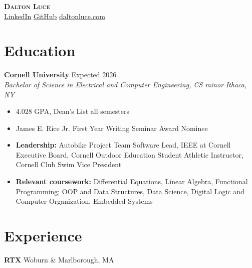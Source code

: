 \documentclass[letterpaper,10pt]{article}
\newcommand{\company}[2]{
    \vspace{6pt}
    {\large \textbf{#1}}
    \hfill
    {\normalsize {#2}}
    \\
}
\newcommand{\resumeEntry}[4]{
    \vspace{4pt}
    {\large \textbf{#1}}
    \hfill
    {\normalsize #2}
    \\
    \textit{#3} \hfill \textit{#4}
    \vspace{1pt}
}
\newcommand{\itemsBegin}{
    \begin{itemize}[leftmargin=0.2in, labelsep=0.05in, itemsep=0pt, parsep=1pt, topsep=0pt, partopsep=0pt]
}
\newcommand{\itemsEnd}{\end{itemize}}
\begin{document}
\textbf{\huge \scshape Dalton Luce} \\
\vspace{2pt}
\small
\addressConditional{}   %
\phoneConditional{}     %
\emailConditional{}     %
\href{https://www.linkedin.com/in/dalton-luce/}{\underline{LinkedIn}} %
\hspace{10pt}
\href{https://github.com/da-luce}{\underline{GitHub}}                 %
\hspace{10pt}
\href{https://daltonluce.com/}{\underline{daltonluce.com}}            %
\vspace{-5pt}

\section{Education}

    \resumeEntry{Cornell University}
        {Expected 2026}
        {Bachelor of Science in Electrical and Computer Engineering, CS minor}
        {Ithaca, NY}

    \itemsBegin{}
        \item 4.028 GPA, Dean's List all semesters
        \item James E. Rice Jr. First Year Writing Seminar Award Nominee
        \item \textbf{Leadership:} Autobike Project Team Software Lead, IEEE at Cornell Executive Board, Cornell Outdoor Education Student Athletic Instructor, Cornell Club Swim Vice President
        \item \textbf{Relevant coursework:} Differential Equations, Linear Algebra, Functional Programming; OOP and Data Structures, Data Science, Digital Logic and Computer Organization, Embedded Systems
    \itemsEnd{}

\section{Experience}

    \company{RTX}{Woburn \& Marlborough, MA}
\end{document}
